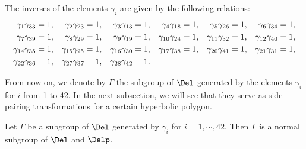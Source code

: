 The inverses of the elements $\gamma_{i}$ are given by the following relations:
\begin{align}
\gamma_{1} \gamma_{33} &= 1, & \gamma_{2} \gamma_{23} &= 1, & \gamma_{3} \gamma_{13} &= 1, & \gamma_{4} \gamma_{18} &= 1, & \gamma_{5} \gamma_{26} &= 1, & \gamma_{6} \gamma_{34} &= 1, \notag \\
\gamma_{7} \gamma_{39} &= 1, & \gamma_{8} \gamma_{29} &= 1, & \gamma_{9} \gamma_{19} &= 1, & \gamma_{10} \gamma_{24} &= 1, & \gamma_{11} \gamma_{32} &= 1, & \gamma_{12} \gamma_{40} &= 1, \notag \\
\gamma_{14} \gamma_{35} &= 1, & \gamma_{15} \gamma_{25} &= 1, & \gamma_{16} \gamma_{30} &= 1, & \gamma_{17} \gamma_{38} &= 1, & \gamma_{20} \gamma_{41} &= 1, & \gamma_{21} \gamma_{31} &= 1, \notag \\
\gamma_{22} \gamma_{36} &= 1, & \gamma_{27} \gamma_{37} &= 1, & \gamma_{28} \gamma_{42} &= 1. \label{eq:sidepairings}
\end{align}

From now on, we denote by $\Gamma$ the subgroup of $\Del$ generated by the elements $\gamma_i$ for $i$ from 1 to 42.
In the next subsection, we will see that they serve as side-pairing transformations for a certain hyperbolic polygon.

\begin{prop}
Let $\Gamma$ be a subgroup of $\Del$ generated by $\gamma_i$ for $i=1,\cdots, 42$. 
Then $\Gamma$ is a normal subgroup of $\Del$ and $\Delp$.
\end{prop}

